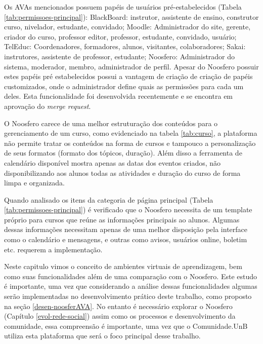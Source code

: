 Os AVAs mencionados possuem papéis de usuários pré-estabelecidos (Tabela \ref{tab:permissoes-principal}): BlackBoard: instrutor, assistente de ensino, construtor curso, nivelador, estudante, convidado; Moodle: Administrador do site, gerente, criador do curso, professor editor, professor, estudante, convidado, usuário; TelEduc: Coordenadores, formadores, alunos, visitantes, colaboradores; Sakai: instrutores, assistente de professor, estudante; Noosfero: Administrador do sistema, moderador, membro, administrador de perfil. Apesar do Noosfero possuir estes papéis pré estabelecidos possui a vantagem de criação de criação de papéis customizados, onde o administrador define quais as permissões para cada um deles. Esta funcionalidade foi desenvolvida recentemente e se encontra em aprovação do \textit{merge request}.

O Noosfero carece de uma melhor estruturação dos conteúdos para o gerenciamento de um curso, como evidenciado na tabela \ref{tab:curso}, a plataforma não permite tratar os conteúdos na forma de cursos e tampouco a personalização de seus formatos (formato dos tópicos, duração). Além disso a ferramenta de calendário disponível mostra apenas as datas dos eventos criados, não disponibilizando aos alunos todas as atividades e duração do curso de forma limpa e organizada.

Quando analisado os itens da categoria de página principal (Tabela \ref{tab:permissoes-principal}) é verificado que o Noosfero necessita de um template próprio para cursos que reúne as informações principais ao alunos. Algumas dessas informações necessitam apenas de uma melhor disposição pela interface como o calendário e mensagens, e outras como avisos, usuários online, boletim etc. requerem a implementação.

Neste capitulo vimos o conceito de ambientes virtuais de aprendizagem, bem como suas funcionalidades além de uma comparação com o Noosfero. Este estudo é importante, uma vez que considerando a análise dessas funcionalidades algumas serão implementadas no desenvolvimento prático deste trabalho, como proposto na seção \ref{desen-noosferAVA}. No entanto é necessário explorar o Noosfero (Capítulo \ref{evol-rede-social}) assim como os processos e desenvolvimento da comunidade, essa compreensão é importante, uma vez que o Comunidade.UnB utiliza esta plataforma que será o foco principal desse trabalho.